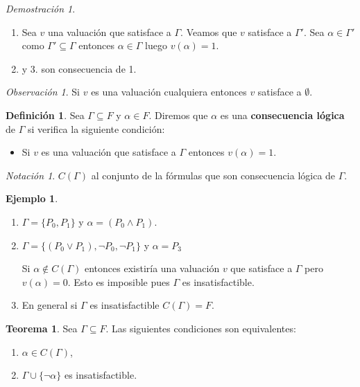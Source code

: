 \documentclass[a4paper,11pt]{article}
\theoremstyle{definition}
\newtheorem{defn}{Definición}[section]
\newtheorem{exap}{Ejemplo}[section]
\newtheorem{teor}{Teorema}[section]
\theoremstyle{remark}
\newtheorem*{remk}{Observación}
\newtheorem*{notc}{Notación}
\newtheorem*{demo}{Demostración}
\begin{document}
\begin{demo}
	\begin{enumerate}
		\item Sea $v$ una valuación que satisface a $\Gamma$. Veamos que $v$ satisface a 
		$\Gamma'$. Sea $\alpha \in \Gamma'$ como $\Gamma' \subseteq \Gamma$ entonces
		$\alpha \in \Gamma$ luego $v(\alpha) = 1$.
		
		\item y 3. son consecuencia de 1.
	\end{enumerate}
\end{demo}

\begin{remk}
	Si $v$ es una valuación cualquiera entonces $v$ satisface a $\emptyset$.
\end{remk}

\begin{defn}
	Sea $\Gamma \subseteq F$ y $\alpha \in F$. Diremos que $\alpha$ es una 
	\textbf{consecuencia lógica} de $\Gamma$ si verifica la siguiente condición:
	
	\begin{itemize}
		\item Si $v$ es una valuación que satisface a $\Gamma$ entonces $v(\alpha) = 1$.
	\end{itemize}
\end{defn}

\begin{notc}
	$C(\Gamma)$ al conjunto de la fórmulas que son consecuencia lógica de $\Gamma$.
\end{notc}

\begin{exap}
	\begin{enumerate}
		\item $\Gamma = \{P_0, P_1\}$ y $\alpha = (P_0 \wedge P_1)$.
		
		\item $\Gamma = \{(P_0 \vee P_1), \neg P_0, \neg P_1\}$ y $\alpha = P_3$
		
		Si $\alpha \not\in C(\Gamma)$ entonces existiría una valuación $v$ que satisface a
		$\Gamma$ pero $v(\alpha) = 0$. Esto es imposible pues $\Gamma$ es insatisfactible.
		
		\item En general si $\Gamma$ es insatisfactible $C(\Gamma) = F$.
	\end{enumerate}
\end{exap}

\begin{teor}
	Sea $\Gamma \subseteq F$. Las siguientes condiciones son equivalentes:
	\begin{enumerate}
		\item $\alpha \in C(\Gamma)$,
		
		\item $\Gamma \cup \{\neg\alpha\}$ es insatisfactible.
	\end{enumerate}
\end{teor}
\end{document}
